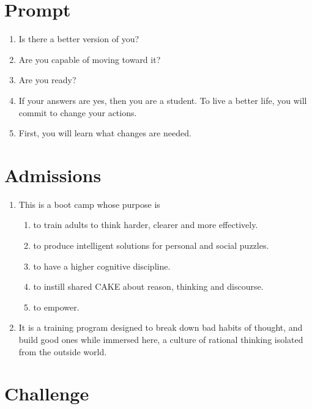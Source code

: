 \documentclass[
]{book}
\providecommand{\tightlist}{%
  \setlength{\itemsep}{0pt}\setlength{\parskip}{0pt}}
\begin{document}
\hypertarget{prompt}{%
\section{Prompt}\label{prompt}}

\begin{enumerate}
\def\labelenumi{\arabic{enumi}.}
\setcounter{enumi}{12}
\tightlist
\item
  Is there a better version of you?
\item
  Are you capable of moving toward it?
\item
  Are you ready?
\item
  If your answers are yes, then you are a student. To live a better
  life, you will commit to change your actions.
\item
  First, you will learn what changes are needed.
\end{enumerate}

\hypertarget{admissions}{%
\section{Admissions}\label{admissions}}

\begin{enumerate}
\def\labelenumi{\arabic{enumi}.}
\setcounter{enumi}{17}
\tightlist
\item
  This is a boot camp whose purpose is

  \begin{enumerate}
  \def\labelenumii{\arabic{enumii}.}
  \tightlist
  \item
    to train adults to think harder, clearer and more effectively.
  \item
    to produce intelligent solutions for personal and social
    puzzles.
  \item
    to have a higher cognitive discipline.
  \item
    to instill shared CAKE about reason, thinking and discourse.
  \item
    to empower.
  \end{enumerate}
\item
  It is a training program designed to break down bad habits of
  thought, and build good ones while immersed here, a culture of
  rational thinking isolated from the outside world.
\end{enumerate}

\hypertarget{challenge}{%
\section{Challenge}\label{challenge}}
\end{document}
